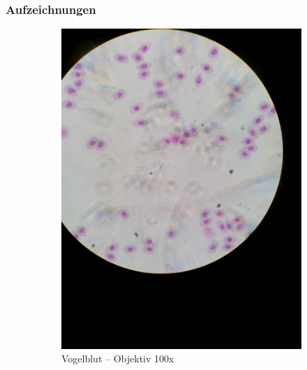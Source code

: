 \subsubsection{Aufzeichnungen}
\begin{figure}[h!]
	\centering
	\begin{subfigure}[b]{0.3\textwidth}
		\includegraphics[width=1\textwidth]{../images/02_bird_blood.jpg}
		\caption{Vogelblut -- Objektiv 100x}
	\end{subfigure}
	\begin{subfigure}[b]{0.3\textwidth}

\end{subfigure}
\end{figure}
